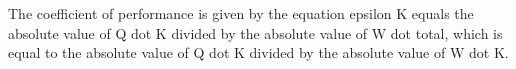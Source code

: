 The coefficient of performance is given by the equation epsilon K equals the absolute value of Q dot K divided by the absolute value of W dot total, which is equal to the absolute value of Q dot K divided by the absolute value of W dot K.